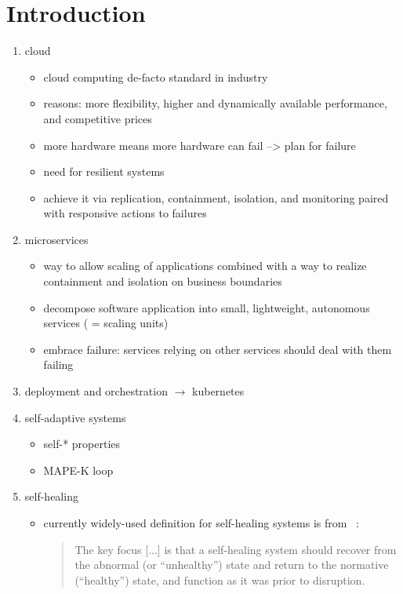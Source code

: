 
\section{Introduction}\label{sec:introduction}
  \begin{enumerate}
    \item cloud
      \begin{itemize}
        \item cloud computing de-facto standard in industry
        \item reasons: more flexibility, higher and dynamically available performance, and competitive prices~\cite{ToffettiMicroservices}
        \item more hardware means more hardware can fail --> plan for failure~\cite{microservices}
        \item need for resilient systems~\cite{reactivemanifesto}
        \item achieve it via replication, containment, isolation, and monitoring paired with responsive actions to failures
      \end{itemize}

    \item microservices
      \begin{itemize}
        \item way to allow scaling of applications combined with a way to realize containment and isolation on business boundaries
        \item decompose software application into small, lightweight, autonomous services ( = scaling units)
        \item embrace failure: services relying on other services should deal with them failing~\cite{microservices}
      \end{itemize}

    \item deployment and orchestration $\rightarrow$ \gls{kubernetes}

    \item self-adaptive systems
      \begin{itemize}
        \item self-* properties
        \item MAPE-K loop
      \end{itemize}

    \item self-healing
      \begin{itemize}
        \item currently widely-used definition for self-healing systems is from \citeauthor{Ghosh}~\cite{Ghosh}:
          \begin{quote}
            The key focus [...] is that a self-healing system should recover from the abnormal (or \enquote{unhealthy}) state and return to the normative (\enquote{healthy}) state, and function as it was prior to disruption.
          \end{quote}


\end{itemize}
\end{enumerate}
